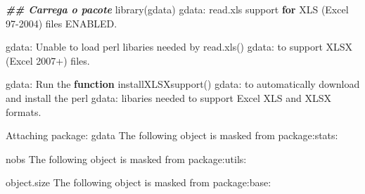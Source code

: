 \documentclass[
  10pt,
  a4paper]{book}
\newenvironment{Shaded}{\begin{snugshade}}{\end{snugshade}}
\newcommand{\ControlFlowTok}[1]{\textcolor[rgb]{0.13,0.29,0.53}{\textbf{#1}}}
\newcommand{\DecValTok}[1]{\textcolor[rgb]{0.00,0.00,0.81}{#1}}
\newcommand{\DocumentationTok}[1]{\textcolor[rgb]{0.56,0.35,0.01}{\textbf{\textit{#1}}}}
\newcommand{\FunctionTok}[1]{\textcolor[rgb]{0.00,0.00,0.00}{#1}}
\newcommand{\NormalTok}[1]{#1}
\newcommand{\SpecialCharTok}[1]{\textcolor[rgb]{0.00,0.00,0.00}{#1}}
\newcommand{\StringTok}[1]{\textcolor[rgb]{0.31,0.60,0.02}{#1}}
\begin{document}
\begin{Shaded}
\begin{Highlighting}[]
\DocumentationTok{\#\# Carrega o pacote}
\FunctionTok{library}\NormalTok{(gdata)}
\NormalTok{gdata}\SpecialCharTok{:}\NormalTok{ read.xls support }\ControlFlowTok{for} \StringTok{\textquotesingle{}XLS\textquotesingle{}}\NormalTok{ (Excel }\DecValTok{97{-}2004}\NormalTok{) files ENABLED.}

\NormalTok{gdata}\SpecialCharTok{:}\NormalTok{ Unable to load perl libaries needed by }\FunctionTok{read.xls}\NormalTok{()}
\NormalTok{gdata}\SpecialCharTok{:}\NormalTok{ to support }\StringTok{\textquotesingle{}XLSX\textquotesingle{}}\NormalTok{ (Excel }\DecValTok{2007}\SpecialCharTok{+}\NormalTok{) files.}

\NormalTok{gdata}\SpecialCharTok{:}\NormalTok{ Run the }\ControlFlowTok{function} \StringTok{\textquotesingle{}installXLSXsupport()\textquotesingle{}}
\NormalTok{gdata}\SpecialCharTok{:}\NormalTok{ to automatically download and install the perl}
\NormalTok{gdata}\SpecialCharTok{:}\NormalTok{ libaries needed to support Excel XLS and XLSX formats.}

\NormalTok{Attaching package}\SpecialCharTok{:} \StringTok{\textquotesingle{}gdata\textquotesingle{}}
\NormalTok{The following object is masked from }\StringTok{\textquotesingle{}package:stats\textquotesingle{}}\SpecialCharTok{:}

\NormalTok{    nobs}
\NormalTok{The following object is masked from }\StringTok{\textquotesingle{}package:utils\textquotesingle{}}\SpecialCharTok{:}

\NormalTok{    object.size}
\NormalTok{The following object is masked from }\StringTok{\textquotesingle{}package:base\textquotesingle{}}\SpecialCharTok{:}


\end{Highlighting}
\end{Shaded}
\end{document}

